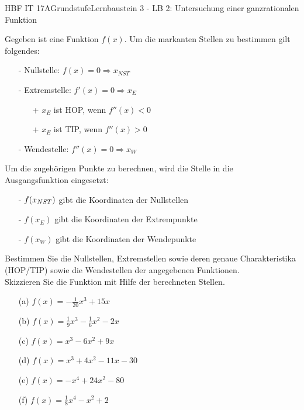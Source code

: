 \documentclass[oneside,openany,headings=optiontotoc,11pt,numbers=noenddot]{scrreprt}
\begin{document}
	\begin{worksheet}{HBF IT 17A}{Grundstufe}{Lernbaustein 3 - LB 2: Untersuchung einer ganzrationalen Funktion}
		\begin{framed}
			\noindent
			\tiny
			Gegeben ist eine Funktion \(f(x)\). Um die markanten Stellen zu bestimmen gilt folgendes:
			\begin{itemize}
				\item[-] Nullstelle: \(f(x) = 0 \Rightarrow x_{NST}\)
				\item[-] Extremstelle: \(f'(x) = 0 \Rightarrow x_E\)
				\begin{itemize}
					\item[+] \(x_E\) ist HOP, wenn \(f''(x) < 0\)
					\item[+] \(x_E\) ist TIP, wenn \(f''(x) > 0\)
				\end{itemize}
				\item[-] Wendestelle: \(f''(x) = 0 \Rightarrow x_W\)
			\end{itemize}
			Um die zugehörigen Punkte zu berechnen, wird die Stelle in die Ausgangsfunktion eingesetzt:
			\begin{itemize}
				\item[-] \(f(x_{\tiny{NST}})\) gibt die Koordinaten der Nullstellen
				\item[-] \(f(x_{E})\) gibt die Koordinaten der Extrempunkte
				\item[-] \(f(x_{W})\) gibt die Koordinaten der Wendepunkte
			\end{itemize}
		\end{framed}
		\begin{framed}
			\noindent\normalsize
			Bestimmen Sie die Nullstellen, Extremstellen sowie deren genaue Charakteristika (HOP/TIP) sowie die Wendestellen der angegebenen Funktionen.\\
			Skizzieren Sie die Funktion mit Hilfe der berechneten Stellen.
			\begin{itemize}
				\item[(a)] \(f(x) = -\frac{1}{20}x^3 +15x\)
				\item[(b)] \(f(x) = \frac{1}{9}x^3 -\frac{1}{6}x^2 -2x\)
				\item[(c)] \(f(x) = x^3-6x^2+9x\)
				\item[(d)] \(f(x) = x^3+4x^2-11x-30\)
				\item[(e)] \(f(x) = -x^4 +24x^2 - 80\)
				\item[(f)] \(f(x) = \frac{1}{8}x^4 -x^2 +2\)
			\end{itemize}
		\end{framed}

\end{worksheet}
\end{document}
